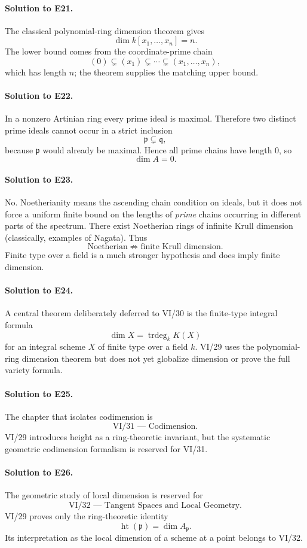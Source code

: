 \paragraph{Solution to E21.}
The classical polynomial-ring dimension theorem gives
\[
\boxed{\dim k[x_1,\ldots,x_n]=n}.
\]
The lower bound comes from the coordinate-prime chain
\[
(0)\subsetneq(x_1)\subsetneq\cdots\subsetneq(x_1,\ldots,x_n),
\]
which has length \(n\); the theorem supplies the matching upper bound.

\paragraph{Solution to E22.}
In a nonzero Artinian ring every prime ideal is maximal.  Therefore two distinct prime ideals cannot
occur in a strict inclusion
\[
\mathfrak p\subsetneq\mathfrak q,
\]
because \(\mathfrak p\) would already be maximal.  Hence all prime chains have length \(0\), so
\[
\boxed{\dim A=0}.
\]

\paragraph{Solution to E23.}
No.  Noetherianity means the ascending chain condition on ideals, but it does not force a uniform
finite bound on the lengths of \emph{prime} chains occurring in different parts of the spectrum.
There exist Noetherian rings of infinite Krull dimension (classically, examples of Nagata).
Thus
\[
\text{Noetherian}\not\Longrightarrow\text{finite Krull dimension}.
\]
Finite type over a field is a much stronger hypothesis and does imply finite dimension.

\paragraph{Solution to E24.}
A central theorem deliberately deferred to VI/30 is the finite-type integral formula
\[
\boxed{\dim X=\operatorname{trdeg}_kK(X)}
\]
for an integral scheme \(X\) of finite type over a field \(k\).  VI/29 uses the polynomial-ring
dimension theorem but does not yet globalize dimension or prove the full variety formula.

\paragraph{Solution to E25.}
The chapter that isolates codimension is
\[
\boxed{\text{VI/31 — Codimension}.}
\]
VI/29 introduces height as a ring-theoretic invariant, but the systematic geometric codimension
formalism is reserved for VI/31.

\paragraph{Solution to E26.}
The geometric study of local dimension is reserved for
\[
\boxed{\text{VI/32 — Tangent Spaces and Local Geometry}.}
\]
VI/29 proves only the ring-theoretic identity
\[
\operatorname{ht}(\mathfrak p)=\dim A_{\mathfrak p}.
\]
Its interpretation as the local dimension of a scheme at a point belongs to VI/32.
